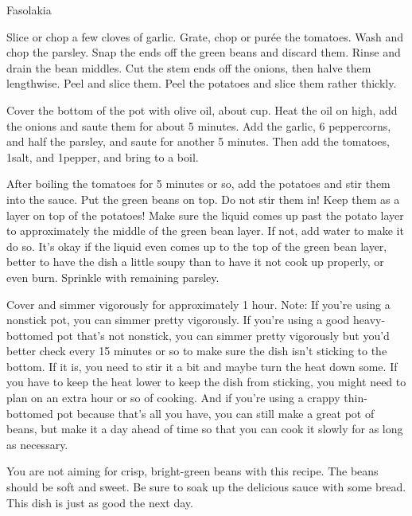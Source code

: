\begin{recipe}[\vegan]{Fasolakia}

    \begin{ingredients}
    \end{ingredients}

    \begin{instructions}
        Slice or chop a few cloves of garlic.
        Grate, chop or purée the tomatoes.
        Wash and chop the parsley.
        Snap the ends off the green beans and discard them.
        Rinse and drain the bean middles.
        Cut the stem ends off the onions, then halve them lengthwise.
        Peel and slice them.
        Peel the potatoes and slice them rather thickly.

        Cover the bottom of the pot with olive oil, about \half cup.
        Heat the oil on high, add the onions and saute them for about 5 minutes.
        Add the garlic, 6 peppercorns, and half the parsley, and saute for another 5 minutes. 
        Then add the tomatoes, 1\half\tsp salt, and 1\tsp pepper, and bring to a boil.

        After boiling the tomatoes for 5 minutes or so, add the potatoes and stir them into the sauce.
        Put the green beans on top.
        Do not stir them in!
        Keep them as a layer on top of the potatoes!
        Make sure the liquid comes up past the potato layer to approximately the middle of the green bean layer.
        If not, add water to make it do so.
        It's okay if the liquid even comes up to the top of the green bean layer, better to have the dish a little soupy than to have it not cook up properly, or even burn.
        Sprinkle with remaining parsley.

        Cover and simmer vigorously for approximately 1 hour.
        Note: If you're using a nonstick pot, you can simmer pretty vigorously.
        If you're using a good heavy-bottomed pot that's not nonstick, you can simmer pretty vigorously but you'd better check every 15 minutes or so to make sure the dish isn't sticking to the bottom.
        If it is, you need to stir it a bit and maybe turn the heat down some.
        If you have to keep the heat lower to keep the dish from sticking, you might need to plan on an extra hour or so of cooking.
        And if you're using a crappy thin-bottomed pot because that's all you have, you can still make a great pot of beans, but make it a day ahead of time so that you can cook it slowly for as long as necessary.

        You are not aiming for crisp, bright-green beans with this recipe.
        The beans should be soft and sweet.
        Be sure to soak up the delicious sauce with some bread.
        This dish is just as good the next day.
    \end{instructions}
\end{recipe}
